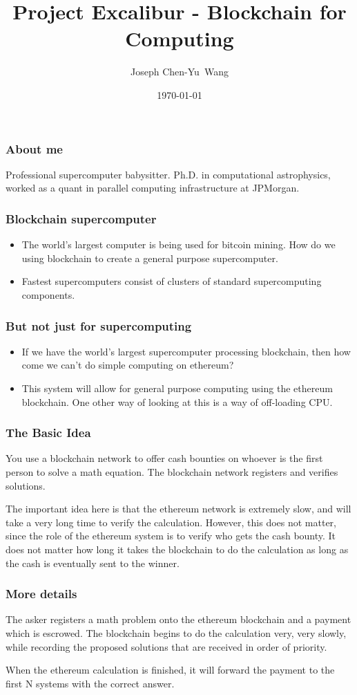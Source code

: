 \documentclass{beamer}
\title {Project Excalibur - Blockchain for Computing}
\author{Joseph Chen-Yu~Wang}
\institute{Bitquant Research Laboratories (Asia) Limited\\
  in association with the Banzai Institute of Advanced Research\\
  and the Hong Kong Caviliers}
\date{\today}
\begin{document}
\frame{\titlepage}
\begin{frame}
  \frametitle{About me}
Professional supercomputer babysitter.  Ph.D. in computational
astrophysics, worked as a quant in parallel computing 
infrastructure at JPMorgan.
\end{frame}
\begin{frame}
  \frametitle{Blockchain supercomputer}
  \begin{itemize}
  \item The world's largest computer is being used for bitcoin mining.  How do
    we using blockchain to create a general purpose supercomputer.  
  \item Fastest supercomputers consist of clusters of standard
    supercomputing components.
  \end{itemize}
\end{frame}
\begin{frame}
  \frametitle{But not just for supercomputing}
  \begin{itemize}
    \item If we have the world's largest supercomputer processing
      blockchain, then how come we can't do simple computing on
      ethereum?
   \item This system will allow for general purpose computing using
     the ethereum blockchain.  One other way of looking at this is a
     way of off-loading CPU.
   \end{itemize}
\end{frame}
\begin{frame}
  \frametitle{The Basic Idea}
You use a blockchain network to offer cash bounties on whoever is
the first person to solve a math equation.  The blockchain network
registers and verifies solutions.

The important idea here is that the ethereum network is extremely
slow, and will take a very long time to verify the calculation.  However,
this does not matter, since the role of the ethereum system is to
verify who gets the cash bounty.  It does not matter how long it takes
the blockchain to do the calculation as long as the cash is eventually
sent to the winner.
\end{frame}
\begin{frame}
  \frametitle{More details}
  The asker registers a math problem onto the ethereum blockchain and
  a payment which is escrowed.  The blockchain begins to do the
  calculation very, very slowly, while recording the proposed
  solutions that are received in order of priority.
  
  When the ethereum calculation is finished, it will forward the payment
  to the first N systems with the correct answer.
\end{frame}
\end{document}
